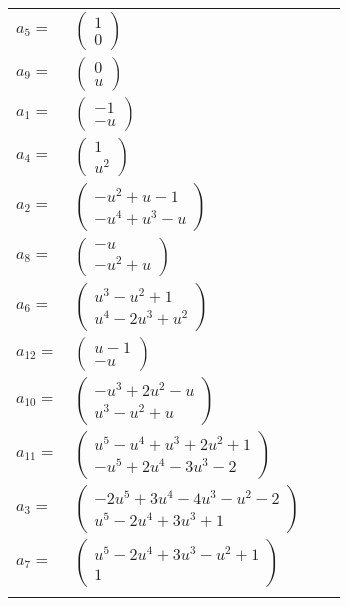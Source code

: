 \documentclass[1p]{elsarticle_modified}
\theoremstyle{definition}
\begin{document}
\begin{tabular}{m{7pt} m{180pt} m{7pt} m{180pt} }
\flushright $a_{5}=$&$\begin{pmatrix}1\\0\end{pmatrix}$ \\
\flushright $a_{9}=$&$\begin{pmatrix}0\\u\end{pmatrix}$ \\
\flushright $a_{1}=$&$\begin{pmatrix}-1\\- u\end{pmatrix}$ \\
\flushright $a_{4}=$&$\begin{pmatrix}1\\u^2\end{pmatrix}$ \\
\flushright $a_{2}=$&$\begin{pmatrix}- u^2+u-1\\- u^4+u^3- u\end{pmatrix}$ \\
\flushright $a_{8}=$&$\begin{pmatrix}- u\\- u^2+u\end{pmatrix}$ \\
\flushright $a_{6}=$&$\begin{pmatrix}u^3- u^2+1\\u^4-2 u^3+u^2\end{pmatrix}$ \\
\flushright $a_{12}=$&$\begin{pmatrix}u-1\\- u\end{pmatrix}$ \\
\flushright $a_{10}=$&$\begin{pmatrix}- u^3+2 u^2- u\\u^3- u^2+u\end{pmatrix}$ \\
\flushright $a_{11}=$&$\begin{pmatrix}u^5- u^4+u^3+2 u^2+1\\- u^5+2 u^4-3 u^3-2\end{pmatrix}$ \\
\flushright $a_{3}=$&$\begin{pmatrix}-2 u^5+3 u^4-4 u^3- u^2-2\\u^5-2 u^4+3 u^3+1\end{pmatrix}$ \\
\flushright $a_{7}=$&$\begin{pmatrix}u^5-2 u^4+3 u^3- u^2+1\\1\end{pmatrix}$\\&\end{tabular}
\end{document}
